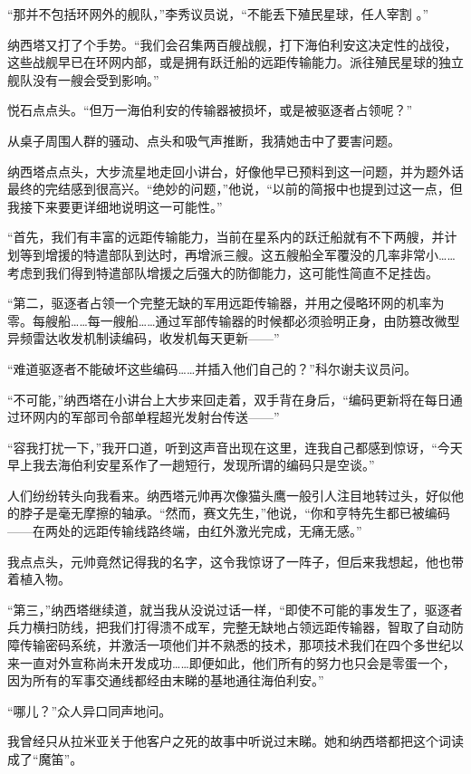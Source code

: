 \documentclass[AutoFakeBold=true]{book}
\begin{document}
``那并不包括环网外的舰队，''李秀议员说，``不能丢下殖民星球，任人宰割 。''

纳西塔又打了个手势。``我们会召集两百艘战舰，打下海伯利安这决定性的战役，这些战舰早已在环网内部，或是拥有跃迁船的远距传输能力。派往殖民星球的独立舰队没有一艘会受到影响。''

悦石点点头。``但万一海伯利安的传输器被损坏，或是被驱逐者占领呢？''

从桌子周围人群的骚动、点头和吸气声推断，我猜她击中了要害问题。

纳西塔点点头，大步流星地走回小讲台，好像他早已预料到这一问题，并为题外话最终的完结感到很高兴。``绝妙的问题，''他说，``以前的简报中也提到过这一点，但我接下来要更详细地说明这一可能性。''

``首先，我们有丰富的远距传输能力，当前在星系内的跃迁船就有不下两艘，并计划等到增援的特遣部队到达时，再增派三艘。这五艘船全军覆没的几率非常小……考虑到我们得到特遣部队增援之后强大的防御能力，这可能性简直不足挂齿。

``第二，驱逐者占领一个完整无缺的军用远距传输器，并用之侵略环网的机率为零。每艘船……{\kaishu 每一艘船}……通过军部传输器的时候都必须验明正身，由防篡改微型异频雷达收发机制读编码，收发机每天更新——''

``难道驱逐者不能破坏这些编码……并插入他们自己的？''科尔谢夫议员问。

``不可能，''纳西塔在小讲台上大步来回走着，双手背在身后，``编码更新将在每日通过环网内的军部司令部单程超光发射台传送——''

``容我打扰一下，''我开口道，听到这声音出现在这里，连我自己都感到惊讶，``今天早上我去海伯利安星系作了一趟短行，发现所谓的编码只是空谈。''

人们纷纷转头向我看来。纳西塔元帅再次像猫头鹰一般引人注目地转过头，好似他的脖子是毫无摩擦的轴承。``然而，赛文先生，''他说，``你和亨特先生都已被编码——在两处的远距传输线路终端，由红外激光完成，无痛无感。''

我点点头，元帅竟然记得我的名字，这令我惊讶了一阵子，但后来我想起，他也带着植入物。

``第三，''纳西塔继续道，就当我从没说过话一样，``即使不可能的事发生了，驱逐者兵力横扫防线，把我们打得溃不成军，完整无缺地占领远距传输器，智取了自动防障传输密码系统，并激活一项他们并不熟悉的技术，那项技术我们在四个多世纪以来一直对外宣称尚未开发成功……即便如此，他们所有的努力也只会是零蛋一个，因为所有的军事交通线都经由末睇的基地通往海伯利安。''

``哪儿？''众人异口同声地问。

我曾经只从拉米亚关于他客户之死的故事中听说过末睇。她和纳西塔都把这个词读成了``魔笛''。
\end{document}

